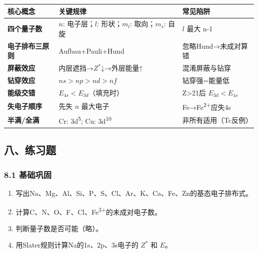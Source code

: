 \documentclass[a4paper,11pt]{ctexart}
\providecommand{\tightlist}{\setlength{\itemsep}{0pt}\setlength{\parskip}{0pt}}
\newcounter{none}
\begin{document}
{\def\LTcaptype{none} %
\begin{longtable}[]{@{}
  >{\raggedright\arraybackslash}p{}
  >{\raggedright\arraybackslash}p{}
  >{\raggedright\arraybackslash}p{}@{}}
\toprule\noalign{}
\begin{minipage}[b]{\linewidth}\raggedright
核心概念
\end{minipage} & \begin{minipage}[b]{\linewidth}\raggedright
关键规律
\end{minipage} & \begin{minipage}[b]{\linewidth}\raggedright
常见陷阱
\end{minipage} \\
\midrule\noalign{}
\endhead
\bottomrule\noalign{}
\endlastfoot
\textbf{四个量子数} & \(n\): 电子层；\(l\): 形状；\(m_l\): 取向；\(m_s\): 自旋 & \(l\) 最大 n-1 \\
\textbf{电子排布三原则} & Aufbau+Pauli+Hund & 忽略Hund→未成对算错 \\
\textbf{屏蔽效应} & 内层遮挡→\(Z^*\)↓→外层能量↑ & 混淆屏蔽与钻穿 \\
\textbf{钻穿效应} & \(ns>np>nd>nf\) & 钻穿强=能量低 \\
\textbf{能级交错} & \(E_{4s}<E_{3d}\)（填充时） & Z\textgreater21后 \(E_{3d}<E_{4s}\) \\
\textbf{失电子顺序} & 先失 \(n\) 最大电子 & Fe→Fe\textsuperscript{2+}应失4s \\
\textbf{半满/全满} & Cr: 3d\textsuperscript{5}; Cu: 3d\textsuperscript{10} & 非所有适用（Tc反例） \\
\end{longtable}
}

\subsection{八、练习题}\label{ux516bux7ec3ux4e60ux9898}

\subsubsection{8.1 基础巩固}\label{ux57faux7840ux5de9ux56fa}

\begin{enumerate}
\def\labelenumi{\arabic{enumi}.}
\tightlist
\item
  写出Na、Mg、Al、Si、P、S、Cl、Ar、K、Ca、Fe、Zn的基态电子排布式。
\item
  计算C、N、O、F、Cl、Fe\textsuperscript{3+}的未成对电子数。
\item
  判断量子数是否可能（略）。
\item
  用Slater规则计算Na的1s、2p、3s电子的 \(Z^*\) 和 \(E\)。
\end{enumerate}
\end{document}
